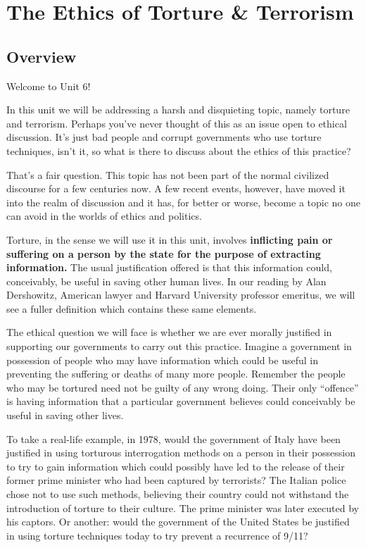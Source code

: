 \documentclass[
]{book}
\begin{document}
\hypertarget{the-ethics-of-torture-terrorism}{%
\chapter{The Ethics of Torture \& Terrorism}\label{the-ethics-of-torture-terrorism}}

\hypertarget{overview-5}{%
\section*{Overview}\label{overview-5}}

Welcome to Unit 6!

In this unit we will be addressing a harsh and disquieting topic, namely torture and terrorism. Perhaps you've never thought of this as an issue open to ethical discussion. It's just bad people and corrupt governments who use torture techniques, isn't it, so what is there to discuss about the ethics of this practice?

That's a fair question. This topic has not been part of the normal civilized discourse for a few centuries now. A few recent events, however, have moved it into the realm of discussion and it has, for better or worse, become a topic no one can avoid in the worlds of ethics and politics.

Torture, in the sense we will use it in this unit, involves \textbf{inflicting pain or suffering on a person by the state for the purpose of extracting information.} The usual justification offered is that this information could, conceivably, be useful in saving other human lives. In our reading by Alan Dershowitz, American lawyer and Harvard University professor emeritus, we will see a fuller definition which contains these same elements.

The ethical question we will face is whether we are ever morally justified in supporting our governments to carry out this practice. Imagine a government in possession of people who may have information which could be useful in preventing the suffering or deaths of many more people. Remember the people who may be tortured need not be guilty of any wrong doing. Their only ``offence'' is having information that a particular government believes could conceivably be useful in saving other lives.

To take a real-life example, in 1978, would the government of Italy have been justified in using torturous interrogation methods on a person in their possession to try to gain information which could possibly have led to the release of their former prime minister who had been captured by terrorists? The Italian police chose not to use such methods, believing their country could not withstand the introduction of torture to their culture. The prime minister was later executed by his captors. Or another: would the government of the United States be justified in using torture techniques today to try prevent a recurrence of 9/11?
\end{document}
